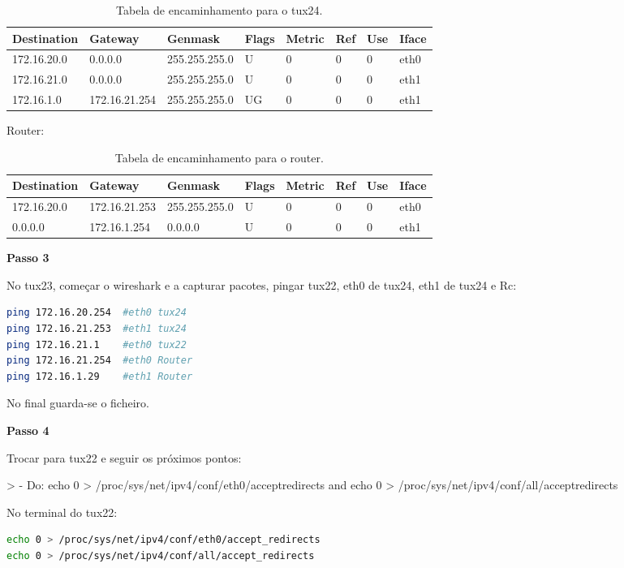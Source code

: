 \begin{table}[h]
    \centering
    \begin{tabular}{|l|l|l|l|l|l|l|l|}
    \hline
        Destination & Gateway & Genmask & Flags & Metric & Ref & Use & Iface \\ \hline
        172.16.20.0 & 0.0.0.0 & 255.255.255.0 & U & 0 & 0 & 0 & eth0 \\ \hline
        172.16.21.0 & 0.0.0.0 & 255.255.255.0 & U & 0 & 0 & 0 & eth1 \\ \hline
        172.16.1.0 & 172.16.21.254 & 255.255.255.0 & UG & 0 & 0 & 0 & eth1 \\ \hline
    \end{tabular}
    \caption{\label{tab:table-name}Tabela de encaminhamento para o tux24.}
\end{table}

Router:

\begin{table}[h!]
    \centering
    \begin{tabular}{|l|l|l|l|l|l|l|l|}
    \hline
        Destination & Gateway & Genmask & Flags & Metric & Ref & Use & Iface \\ \hline
        172.16.20.0 & 172.16.21.253 & 255.255.255.0 & U & 0 & 0 & 0 & eth0 \\ \hline
        0.0.0.0 & 172.16.1.254 & 0.0.0.0 & U & 0 & 0 & 0 & eth1 \\ \hline
    \end{tabular}
    \caption{\label{tab:table-name}Tabela de encaminhamento para o router.}
\end{table}


\textbf{Passo 3}

No tux23, começar o wireshark e a capturar pacotes, pingar tux22, eth0 de tux24, eth1 de tux24 e Rc:
\begin{lstlisting}[language=bash]
ping 172.16.20.254  #eth0 tux24
ping 172.16.21.253  #eth1 tux24
ping 172.16.21.1    #eth0 tux22
ping 172.16.21.254  #eth0 Router
ping 172.16.1.29    #eth1 Router
\end{lstlisting}

No final guarda-se o ficheiro.

\textbf{Passo 4}

Trocar para tux22 e seguir os próximos pontos:

> - Do:  echo 0 > /proc/sys/net/ipv4/conf/eth0/acceptredirects and  echo 0 > /proc/sys/net/ipv4/conf/all/acceptredirects

No terminal do tux22:
\begin{lstlisting}[language=bash]
echo 0 > /proc/sys/net/ipv4/conf/eth0/accept_redirects
echo 0 > /proc/sys/net/ipv4/conf/all/accept_redirects
\end{lstlisting}

